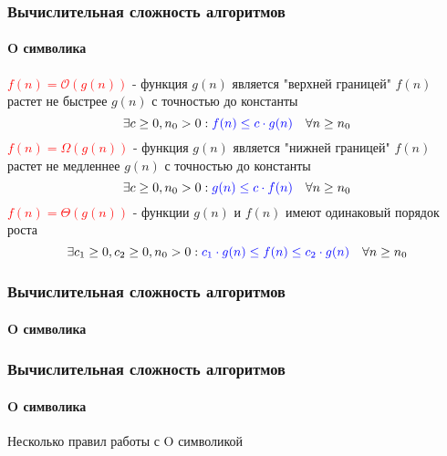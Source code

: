 \documentclass[aspectratio=169]{beamer}
\begin{document}
\begin{frame}
\frametitle{Вычислительная сложность алгоритмов}
\framesubtitle{O символика}
\justifying
\textcolor{red}{$f(n) = \mathcal{O}(g(n))$} - функция $g(n)$ является "верхней границей" \newline $f(n)$ растет не быстрее $g(n)$ с точностью до константы\newline $$ \exists   c \geq 0 ,  n_0 > 0 : \textcolor{blue}{f(n) \leq c \cdot g(n)} \quad \forall n \geq n_0$$\newline
\textcolor{red}{$f(n) = \Omega(g(n))$} - функция $g(n)$ является "нижней границей" \newline $f(n)$ растет не медленнее $g(n)$ с точностью до константы\newline $$ \exists   c \geq 0 ,  n_0 > 0 : \textcolor{blue}{g(n) \leq c \cdot f(n)} \quad \forall n \geq n_0$$\newline
\textcolor{red}{$f(n) = \Theta(g(n))$} - функции $g(n)$ и $f(n)$ имеют одинаковый порядок роста \newline  $$ \exists   c_1 \geq 0, c_2 \geq 0 ,  n_0 > 0 : \textcolor{blue}{c_1 \cdot g(n) \leq f(n) \leq c_2 \cdot g(n)} \quad \forall n \geq n_0$$
\end{frame}
\begin{frame}
\frametitle{Вычислительная сложность алгоритмов}
\framesubtitle{O символика}
\justifying

\begin{figure}
    \captionsetup[subfigure]{labelformat=empty}
    \centering
\end{figure}
\end{frame}

\begin{frame}
\frametitle{Вычислительная сложность алгоритмов}
\framesubtitle{O символика}
\justifying
Несколько правил работы с O символикой

\begin{figure}
    \captionsetup[subfigure]{labelformat=empty}
    \centering
\end{figure}
\end{frame}
\end{document}
